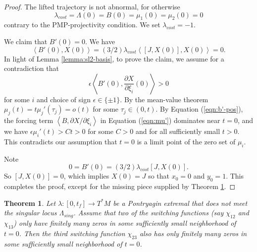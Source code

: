 \documentclass{article}
\newtheorem{theorem}{Theorem}[subsection]
\theoremstyle{remark}
\newcommand{\ang}[1]{\left\langle{#1}\right\rangle}
\newcommand\Lsing{\Lambda_{sing}}
\newcommand{\partials}[2]{\frac{\partial #1}{\partial #2}}
\begin{document}
\begin{proof}
The lifted trajectory is not abnormal, for otherwise 
\[
\lambda_{cost} =
\Lambda(0)=B(0)=\mu_1(0)=\mu_2(0)=0
\]
 contrary to the PMP-projectivity condition.
We set $\lambda_{cost}=-1$.


We claim that $B'(0)=0$. We have
\[
\ang{B'(0),X(0)} = (3/2)\lambda_{cost}\ang{[J,X(0)],X(0)} = 0.
\]
In light of Lemma \ref{lemma:sl2-basis}, to prove the claim, we  assume for a
contradiction that
\begin{equation}\label{eqn:b'-pos}
\epsilon\ang{B'(0),\partials{X}{\xi_i}(0)}>0
\end{equation}
for some $i$ and choice of sign $\epsilon\in\{\pm 1\}$.  By the
mean-value theorem $\mu_j(t) = t\mu_j'(\tau_j) = o(t)$ for some
$\tau_j\in (0,t)$.  By Equation (\ref{eqn:b'-pos}), the forcing term
$\ang{B,\partial X/\partial \xi_i}$ in Equation (\ref{eqn:mu'})
dominates near $t=0$, and we have $\epsilon \mu_i'(t) > C t >0$ for
some $C>0$ and for all sufficiently small $t>0$.  This contradicts our
assumption that $t=0$ is a limit point of the zero set of $\mu_i$.

Note
\[
0=B'(0)=(3/2)\lambda_{cost} [J,X(0)].
\]
So $[J,X(0)]=0$,  which implies $X(0) = J$ so that $x_0=0$ and $y_0=1$.
This completes the proof, except for the missing piece supplied by 
Theorem \ref{lemma:no-chatter2}.
\end{proof}

\begin{theorem}\label{lemma:no-chatter2}
  Let $\lambda:[0,t_f]\to T^*M$ be a Pontryagin extremal that does not
  meet the singular locus $\Lsing$.  Assume that two of the switching
  functions (say $\chi_{12}$ and $\chi_{13}$) only have finitely many zeros
  in some sufficiently small neighborhood of $t=0$.  Then the third
  switching function $\chi_{23}$ also has only finitely many zeros in
  some sufficiently small neighborhood of $t=0$.
%
\end{theorem}
\end{document}
